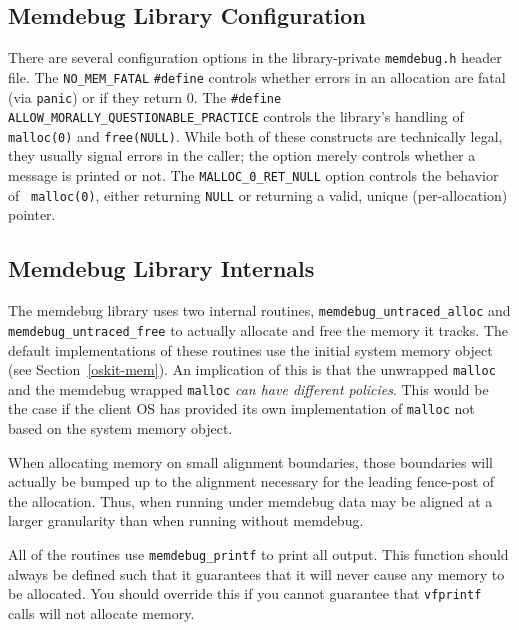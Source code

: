 \subsection{Memdebug Library Configuration}

There are several configuration options in the library-private
{\tt memdebug.h} header file.  The {\tt NO_MEM_FATAL} \texttt{\#define}
controls whether errors in an allocation are fatal (via {\tt panic})
or if they return 0.
The \texttt{\#define} {\tt ALLOW_MORALLY_QUESTIONABLE_PRACTICE}
controls the library's
handling of {\tt malloc(0)} and {\tt free(NULL)}.  While both of these
constructs are technically legal, they usually signal errors in the
caller; the option merely controls whether a message is printed or not.  
The {\tt MALLOC_0_RET_NULL} option controls the behavior of {\tt
malloc(0)}, either returning {\tt NULL} or returning a valid, unique
(per-allocation) pointer.

\subsection{Memdebug Library Internals}
The memdebug library uses two internal routines,
{\tt memdebug_untraced_alloc} and {\tt memdebug_untraced_free}
to actually allocate and free the memory it tracks.
The default implementations of these routines use
the initial system memory object (see Section~\ref{oskit-mem}).
An implication of this is that the unwrapped {\tt malloc} and the memdebug
wrapped {\tt malloc} \emph{can have different policies}.  This would be the
case if the client OS has provided its own implementation of {\tt malloc}
not based on the system memory object.

When allocating memory on small alignment boundaries, those boundaries
will actually be bumped up to the alignment necessary for the leading
fence-post of the allocation.  Thus, when running under memdebug data
may be aligned at a larger granularity than when running without
memdebug.

All of the routines use {\tt memdebug_printf} to print all output.
This function should always be defined such that it guarantees that
it will never cause any memory to be allocated.
You should override this if you cannot guarantee that {\tt vfprintf} calls 
will not allocate memory.  

